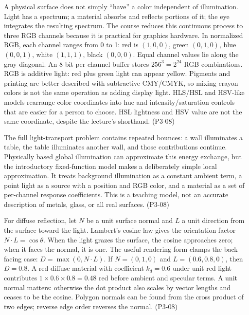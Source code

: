 \hypertarget{03-visual-computing-i-ch011-color-and-the-simplified-local-lighting-model}{}

A physical surface does not simply ``have'' a color independent of illumination. Light has a spectrum; a material absorbs and reflects portions of it; the eye integrates the resulting spectrum. The course reduces this continuous process to three RGB channels because it is practical for graphics hardware. In normalized RGB, each channel ranges from 0 to 1: red is \((1,0,0)\), green \((0,1,0)\), blue \((0,0,1)\), white \((1,1,1)\), black \((0,0,0)\). Equal channel values lie along the gray diagonal. An 8-bit-per-channel buffer stores \(256^3=2^{24}\) RGB combinations. RGB is additive light: red plus green light can appear yellow. Pigments and printing are better described with subtractive CMY/CMYK, so mixing crayon colors is not the same operation as adding display light. HLS/HSL and HSV-like models rearrange color coordinates into hue and intensity/saturation controls that are easier for a person to choose. HSL lightness and HSV value are not the same coordinate, despite the lecture's shorthand. (P3-08)

The full light-transport problem contains repeated bounces: a wall illuminates a table, the table illuminates another wall, and those contributions continue. Physically based global illumination can approximate this energy exchange, but the introductory fixed-function model makes a deliberately simple local approximation. It treats background illumination as a constant ambient term, a point light as a source with a position and RGB color, and a material as a set of per-channel response coefficients. This is a teaching model, not an accurate description of metals, glass, or all real surfaces. (P3-08)

For diffuse reflection, let \(N\) be a unit surface normal and \(L\) a unit direction from the surface toward the light. Lambert's cosine law gives the orientation factor \(N\cdot L=\cos\theta\). When the light grazes the surface, the cosine approaches zero; when it faces the normal, it is one. The useful rendering form clamps the back-facing case: \(D=\max(0,N\cdot L)\). If \(N=(0,1,0)\) and \(L=(0.6,0.8,0)\), then \(D=0.8\). A red diffuse material with coefficient \(k_d=0.6\) under unit red light contributes \(1\times0.6\times0.8=0.48\) red before ambient and specular terms. A unit normal matters: otherwise the dot product also scales by vector lengths and ceases to be the cosine. Polygon normals can be found from the cross product of two edges; reverse edge order reverses the normal. (P3-08)

